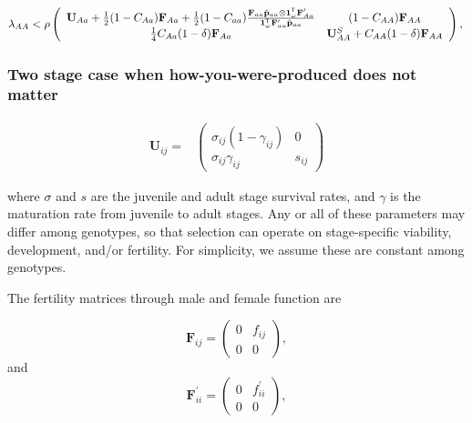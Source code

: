 \documentclass[11pt]{article}
\def\mbf#1{\mathbf{#1}}
\newcommand{\tr}{{\mbox{\tiny \sf T}}}
\begin{document}
\begin{landscape}
\begin{equation} \label{eq:coexist_baa}
	\lambda_{AA} < 
			\rho\left(\begin{array}{cc}
\mathbf{U}_{Aa} + \frac{1}{2} (1 - C_{Aa}) \mbf{F}_{Aa} +\frac{1}{2} (1 - C_{aa})\frac{\mbf{F}_{aa}\hat{\mbf{p}}_{aa}\otimes \mathbf{1}^\tr_{\omega} \mathbf{F}_{Aa}^\prime}{\mathbf{1}^\tr_\omega \mathbf{F}_{aa}^\prime \hat{\mathbf{p}}_{aa}	} & (1-C_{AA}) \mbf{F}_{AA} \\
\frac{1}{4} C_{Aa} (1 - \delta) \mbf{F}_{Aa}  &\mathbf{U}^S_{AA} +C_{AA} (1 - \delta) \mbf{F}_{AA}  \\ 
			\end{array} \right), \\ 
\end{equation} 
\end{landscape}

\subsubsection*{Two stage case when how-you-were-produced does not matter}


\begin{align*}
	\mbf{U}_{ij} = &\left(
					\begin{array}{cc}
						\sigma_{ij}(1 - \gamma_{ij}) & 0 \\
						\sigma_{ij} \gamma_{ij}     & s_{ij}
					\end{array}
				\right)  
\end{align*}

\noindent where $\sigma$ and $s$ are the juvenile and adult stage survival rates, and $\gamma$ is the maturation rate from juvenile to adult stages. Any or all of these parameters may differ among genotypes, so that selection can operate on stage-specific viability, development, and/or fertility. For simplicity, we assume these are constant among genotypes. 

The fertility matrices through male and female function are

\begin{equation}
	\mbf{F}_{ij} = \left(
					\begin{array}{cc}
						0 &  f_{ij} \\
						0 & 0
					\end{array}
				\right),
\end{equation}
\noindent and
\begin{equation}
	\mbf{F}^{\prime}_{ii} = \left(
					\begin{array}{cc}
						0 &  f^{\prime}_{ii} \\
						0 & 0
					\end{array}
				\right),
\end{equation}
\end{document}
